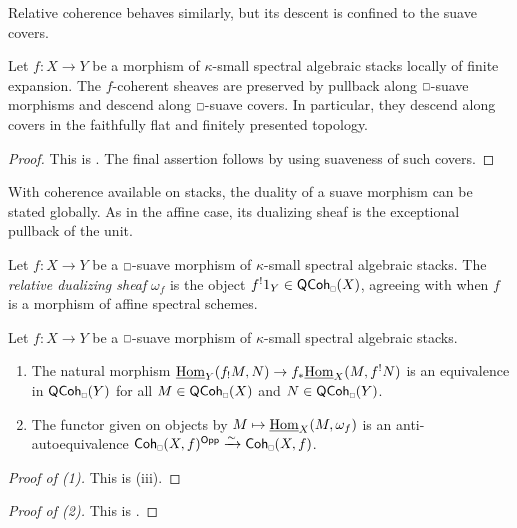 Relative coherence behaves similarly, but its descent is confined to the suave covers.
\begin{proposition}\label{prop: coherent sheaves on stacks}
    Let $f: X\to Y$ be a morphism of $\kappa$-small spectral algebraic stacks locally of finite expansion. The $f$-coherent sheaves are preserved by pullback along $\msld$-suave morphisms and descend along $\msld$-suave covers. In particular, they descend along covers in the faithfully flat and finitely presented topology.
\end{proposition}
\begin{proof}
    This is \cite[Lem. 4.4.8 \& 4.5.16]{HeyerMann6FF}. The final assertion follows by  using suaveness of such covers.
\end{proof}
With coherence available on stacks, the duality of a suave morphism can be stated globally. As in the affine case, its dualizing sheaf is the exceptional pullback of the unit.
\begin{definition}\label{def: dualizing sheaf on stacks}
    Let $f: X\to Y$ be a $\msld$-suave morphism of $\kappa$-small spectral algebraic stacks. The \emph{relative dualizing sheaf} $\omega_{f}$ is the object $f^{!}1_{Y}\in\QCoh_{\sld}(X)$, agreeing with  when $f$ is a morphism of affine spectral schemes.
\end{definition}
\begin{theorem}\label{thm: Grothendieck Verdier duality stacks}
    Let $f: X\to Y$ be a $\msld$-suave morphism of $\kappa$-small spectral algebraic stacks.
    \begin{enumerate}
        \item The natural morphism $\underline{\mathrm{Hom}}_{Y}(f_{!}M,N)\to f_{*}\underline{\mathrm{Hom}}_{X}(M,f^{!}N)$ is an equivalence in $\QCoh_{\sld}(Y)$ for all $M\in\QCoh_{\sld}(X)$ and $N\in\QCoh_{\sld}(Y)$.
        \item The functor given on objects by $M\mapsto\underline{\mathrm{Hom}}_{X}(M,\omega_{f})$ is an anti-autoequivalence $\Coh_{\sld}(X,f)^{\Opp}\xrightarrow{\sim}\Coh_{\sld}(X,f)$.
    \end{enumerate}
\end{theorem}
\begin{proof}[Proof of (1)]
    This is \cite[Prop. 3.2.2]{HeyerMann6FF} (iii).
\end{proof}
\begin{proof}[Proof of (2)]
    This is \cite[Lem. 4.4.4 \& 4.4.17]{HeyerMann6FF}.
\end{proof}
